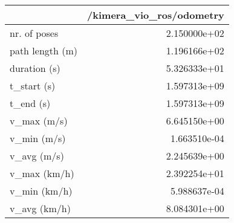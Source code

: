 \begin{tabular}{lr}
\toprule
{} &  /kimera\_vio\_ros/odometry \\
\midrule
nr. of poses    &              2.150000e+02 \\
path length (m) &              1.196166e+02 \\
duration (s)    &              5.326333e+01 \\
t\_start (s)     &              1.597313e+09 \\
t\_end (s)       &              1.597313e+09 \\
v\_max (m/s)     &              6.645150e+00 \\
v\_min (m/s)     &              1.663510e-04 \\
v\_avg (m/s)     &              2.245639e+00 \\
v\_max (km/h)    &              2.392254e+01 \\
v\_min (km/h)    &              5.988637e-04 \\
v\_avg (km/h)    &              8.084301e+00 \\
\bottomrule
\end{tabular}
